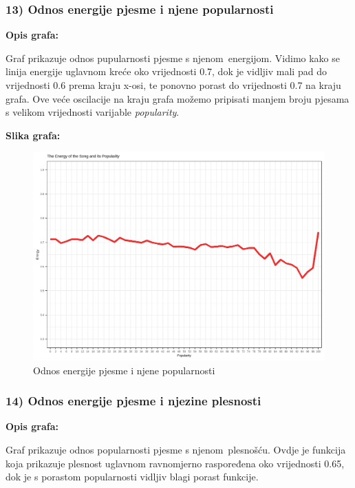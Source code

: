     \subsubsection{13) Odnos energije pjesme i njene popularnosti}
    
    \textbf{Opis grafa:}
    
    Graf prikazuje odnos pupularnosti pjesme s njenom energijom. Vidimo kako se linija energije uglavnom kreće oko vrijednosti 0.7, dok je vidljiv mali pad do vrijednosti 0.6 prema kraju x-osi, te ponovno porast do vrijednosti 0.7 na kraju grafa. Ove veće oscilacije na kraju grafa možemo pripisati manjem broju pjesama s velikom vrijednosti varijable \textit{popularity}.
    
    
    \textbf{Slika grafa:}
    \begin{figure}[H]
    	\includegraphics[scale=0.9]{slike/energy_popularity.png}
    	\centering
    	\caption{Odnos energije pjesme i njene popularnosti}
    	
    \end{figure}
    
    \subsubsection{14) Odnos energije pjesme i njezine plesnosti}
    
    \textbf{Opis grafa:}
    
    Graf prikazuje odnos popularnosti pjesme s njenom plesnošću. Ovdje je funkcija koja prikazuje plesnost uglavnom ravnomjerno raspoređena oko vrijednosti 0.65, dok je s porastom popularnosti vidljiv blagi porast funkcije.
    
